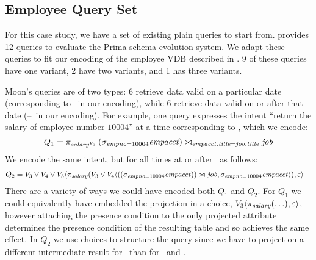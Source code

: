 \subsection{Employee Query Set}
\label{app:emp-qs}


For this case study, we have a set of existing plain queries to start from.
\citet{prima08Moon} provides 12 queries to evaluate the Prima schema evolution
system. We adapt these queries to fit our encoding of the employee VDB
described in .
%
%
9 of these queries have one variant, 2 have two variants, and 1 has three
variants. 


Moon's queries are of two types: 6 retrieve data valid on a particular date
(corresponding to \vThree\ in our encoding), while 6 retrieve data valid on or
after that date (\vThree--\vFive\ in our encoding).
%
For example, one query expresses the intent ``return the salary of employee
number $10004$'' at a time corresponding to \vThree, which we encode:
\[
Q_1 = \vPrj[\oatt{\salary}{\vThree}]{%
  \joinRelR{\selectRel{\empno=10004}{\empacct}}{\job}
           {\empacct.\titleatt = \job.\titleatt}}
\]
%
%
We encode the same intent, but for all times at or after \vThree\ as follows:
%
\begin{align*}
Q_2 &=  \vThree\vee\vFour\vee\vFive \langle \pi_\salary 
 (\vThree\vee\vFour\langle
    \joinRelR{(\vSel[\empno=10004]{\empacct})}{\job}
             {}, 
{\vSel[\empno=10004]{\empacct}}\rangle), \empRel\rangle
\end{align*}
%
There are a variety of ways we could have encoded both $Q_1$ and $Q_2$.
%
For $Q_1$ we could equivalently have embedded the projection in a choice,
$\chc[\vThree]{\vPrj[\salary]{(\ldots)},\empRel}$, however attaching the presence
condition to the only projected attribute determines the presence condition of
the resulting table and so achieves the same effect.
%
In $Q_2$ we use choices to structure the query since we have to project on a
different intermediate result for \vFive\ than for \vThree\ and \vFour.

